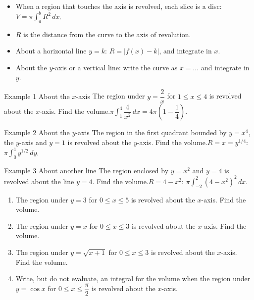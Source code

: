 \documentclass[11pt]{article}
\begin{document}

\begin{ideabox}
\begin{itemize}[leftmargin=*,itemsep=2pt,topsep=2pt]
  \item When a region that touches the axis is revolved, each slice is a disc: $V=\pi\displaystyle\int_{a}^{b}R^2\,dx$.
  \item $R$ is the distance from the curve to the axis of revolution.
  \item About a horizontal line $y=k$: $R=|f(x)-k|$, and integrate in $x$.
  \item About the $y$-axis or a vertical line: write the curve as $x=\ldots$ and integrate in $y$.
\end{itemize}
\end{ideabox}

\begin{example}{Example 1 \textperiodcentered{} About the $x$-axis}
The region under $y=\dfrac2x$ for $1\le x\le4$ is revolved about the $x$-axis. Find the volume.\soln $\pi\displaystyle\int_{1}^{4}\dfrac{4}{x^2}\,dx=4\pi\left(1-\dfrac14\right)$.
\end{example}

\begin{example}{Example 2 \textperiodcentered{} About the $y$-axis}
The region in the first quadrant bounded by $y=x^4$, the $y$-axis and $y=1$ is revolved about the $y$-axis. Find the volume.\soln $R=x=y^{1/4}$: $\pi\displaystyle\int_{0}^{1}y^{1/2}\,dy$.
\end{example}

\begin{example}{Example 3 \textperiodcentered{} About another line}
The region enclosed by $y=x^2$ and $y=4$ is revolved about the line $y=4$. Find the volume.\soln $R=4-x^2$: $\pi\displaystyle\int_{-2}^{2}(4-x^2)^2\,dx$.
\end{example}

\newpage
{}

\begin{enumerate}[leftmargin=*,itemsep=2pt]
  \item The region under $y=3$ for $0\le x\le5$ is revolved about the $x$-axis. Find the volume.\work{2.3cm}
  \item The region under $y=x$ for $0\le x\le3$ is revolved about the $x$-axis. Find the volume.\work{2.3cm}
  \item The region under $y=\sqrt{x+1}$ for $0\le x\le3$ is revolved about the $x$-axis. Find the volume.\work{2.3cm}
  \item Write, but do not evaluate, an integral for the volume when the region under $y=\cos x$ for $0\le x\le\dfrac\pi2$ is revolved about the $x$-axis.\work{2.3cm}
\end{enumerate}
\end{document}
